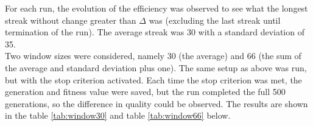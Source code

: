 For each run, the evolution of the efficiency was observed to see what the longest streak without change greater than $\Delta$ was (excluding the last streak until termination of the run). The average streak was 30 with a standard deviation of 35.\\
\newline
Two window sizes were considered, namely 30 (the average) and 66 (the sum of the average and standard deviation plus one). The same setup as above was run, but with the stop criterion activated. Each time the stop criterion was met, the generation and fitness value were saved, but the run completed the full 500 generations, so the difference in quality could be observed. The results are shown in the table \ref{tab:window30} and table \ref{tab:window66} below.\\

